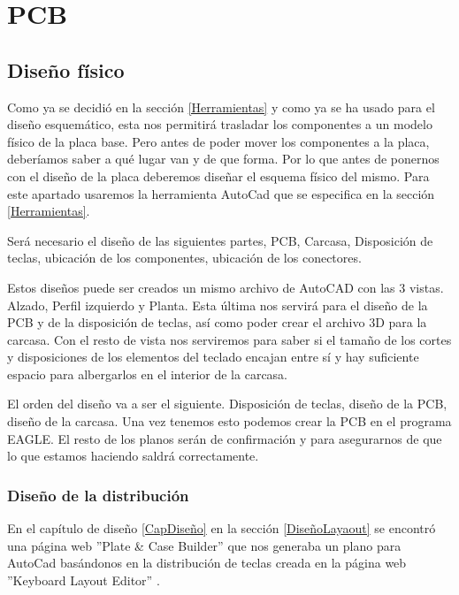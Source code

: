 \chapter{PCB}

\section{Diseño físico} \label{DiseñoFisico}

Como ya se decidió en la sección \ref{Herramientas} y como ya se ha usado para el diseño esquemático, esta nos permitirá trasladar los componentes a un modelo físico de la placa base. Pero antes de poder mover los componentes a la placa, deberíamos saber a qué lugar van y de que forma. Por lo que antes de ponernos con el diseño de la placa deberemos diseñar el esquema físico del mismo. Para este apartado usaremos la herramienta AutoCad que se especifica en la sección \ref{Herramientas}.

Será necesario el diseño de las siguientes partes, \gls{PCB}, Carcasa, Disposición de teclas, ubicación de los componentes, ubicación de los conectores.

Estos diseños puede ser creados un mismo archivo de AutoCAD con las 3 vistas. Alzado, Perfil izquierdo y Planta. Esta última nos servirá para el diseño de la \gls{PCB} y de la disposición de teclas, así como poder crear el archivo 3D para la carcasa. Con el resto de vista nos serviremos para saber si el tamaño de los cortes y disposiciones de los elementos del teclado encajan entre sí y hay suficiente espacio para albergarlos en el interior de la carcasa.

El orden del diseño va a ser el siguiente. Disposición de teclas, diseño de la \gls{PCB}, diseño de la carcasa. Una vez tenemos esto podemos crear la \gls{PCB} en el programa EAGLE. El resto de los planos serán de confirmación y para asegurarnos de que lo que estamos haciendo saldrá correctamente.

\newpage
\subsection{Diseño de la distribución} \label{CreacionPlanoDistribucion}

En el capítulo de diseño \ref{CapDiseño} en la sección \ref{DiseñoLayaout} se encontró una página web ''Plate \& Case Builder'' \cite{builder-swillkb} que nos generaba un plano para AutoCad basándonos en la distribución de teclas creada en la página web ''Keyboard Layout Editor'' \cite{Layout-Editor}.

